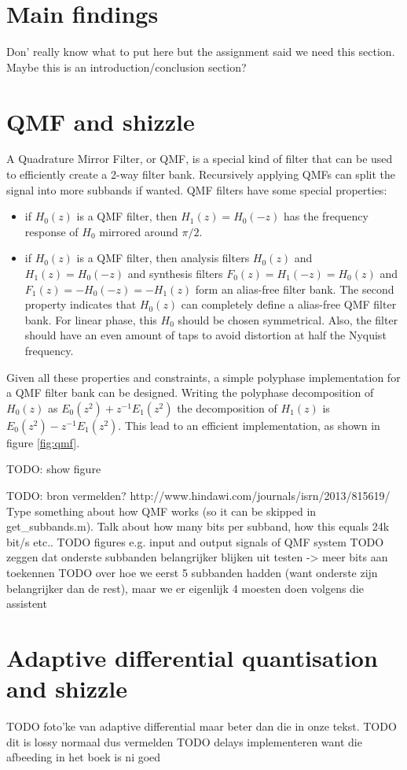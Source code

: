 \documentclass[a4paper]{article}
\begin{document}
\section{Main findings}
Don' really know what to put here but the assignment said we need this section. Maybe this is an introduction/conclusion section?

\section{QMF and shizzle}
A Quadrature Mirror Filter, or QMF, is a special kind of filter that can be used to efficiently create a 2-way filter bank. Recursively applying QMFs can split the signal into more subbands if wanted. QMF filters have some special properties:
\begin{itemize}
\item if $H_0(z)$ is a QMF filter, then $H_1(z) = H_0(-z)$ has the frequency response of $H_0$ mirrored around $\pi/2$.
\item if $H_0(z)$ is a QMF filter, then analysis filters $H_0(z)$ and $H_1(z) = H_0(-z)$ and synthesis filters $F_0(z)=H_1(-z)=H_0(z)$ and $F_1(z)=-H_0(-z) = -H_1(z)$ form an alias-free filter bank.
The second property indicates that $H_0(z)$ can completely define a alias-free QMF filter bank. For linear phase, this $H_0$ should be chosen symmetrical. Also, the filter should have an even amount of taps to avoid distortion at half the Nyquist frequency. 
\end{itemize}
Given all these properties and constraints, a simple polyphase implementation for a QMF filter bank can be designed. Writing the polyphase decomposition of $H_0(z)$ as $E_0(z^2) + z^{-1} E_1(z^2)$ the decomposition of $H_1(z)$ is $E_0(z^2) - z^{-1} E_1(z^2)$. This lead to an efficient implementation, as shown in figure \ref{fig:qmf}.

TODO: show figure

TODO: bron vermelden? http://www.hindawi.com/journals/isrn/2013/815619/
Type something about how QMF works (so it can be skipped in get\_subbands.m). Talk about how many bits per subband, how this equals 24k bit/s etc..
TODO figures e.g. input and output signals of QMF system
TODO zeggen dat onderste subbanden belangrijker blijken uit testen -> meer bits aan toekennen
TODO over hoe we eerst 5 subbanden hadden (want onderste zijn belangrijker dan de rest), maar we er eigenlijk 4 moesten doen volgens die assistent

\section{Adaptive differential quantisation and shizzle}
TODO foto'ke van adaptive differential maar beter dan die in onze tekst.
TODO dit is lossy normaal dus vermelden
TODO delays implementeren want die afbeeding in het boek is ni goed 
\end{document}
